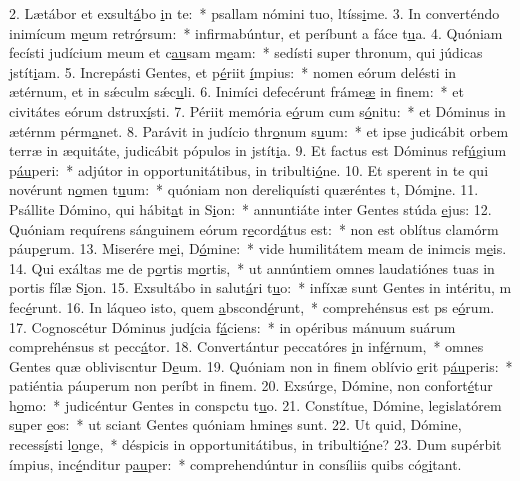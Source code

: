 2. Lætábor et exsult\uline{á}bo \uline{i}n te:~* psallam nómini tuo, ltíss\uline{i}me.
3. In converténdo inimícum m\uline{e}um retr\uline{ó}rsum:~* infirmabúntur, et períbunt a fáce t\uline{u}a.
4. Quóniam fecísti judícium meum et c\uline{au}sam m\uline{e}am:~* sedísti super thronum, qui júdicas jstít\uline{i}am.
5. Increpásti Gentes, et p\uline{é}riit \uline{í}mpius:~* nomen eórum delésti in ætérnum, et in sǽculm sǽc\uline{u}li.
6. Inimíci defecérunt fráme\uline{æ} in f\uline{i}nem:~* et civitátes eórum dstrux\uline{í}sti.
7. Périit memória e\uline{ó}rum cum s\uline{ó}nitu:~* et Dóminus in ætérnm pérm\uline{a}net.
8. Parávit in judício thr\uline{o}num s\uline{u}um:~* et ipse judicábit orbem terræ in æquitáte, judicábit pópulos in jstít\uline{i}a.
9. Et factus est Dóminus ref\uline{ú}gium p\uline{áu}peri:~* adjútor in opportunitátibus, in tribulti\uline{ó}ne.
10. Et sperent in te qui novérunt n\uline{o}men t\uline{u}um:~* quóniam non dereliquísti quæréntes t, Dóm\uline{i}ne.
11. Psállite Dómino, qui hábit\uline{a}t in S\uline{i}on:~* annuntiáte inter Gentes stúda \uline{e}jus:
12. Quóniam requírens sánguinem eórum r\uline{e}cord\uline{á}tus est:~* non est oblítus clamórm páup\uline{e}rum.
13. Miserére m\uline{e}i, D\uline{ó}mine:~* vide humilitátem meam de inimcis m\uline{e}is.
14. Qui exáltas me de p\uline{o}rtis m\uline{o}rtis,~* ut annúntiem omnes laudatiónes tuas in portis fílæ S\uline{i}on.
15. Exsultábo in salut\uline{á}ri t\uline{u}o:~* infíxæ sunt Gentes in intéritu, m fec\uline{é}runt.
16. In láqueo isto, quem \uline{a}bscond\uline{é}runt,~* comprehénsus est ps e\uline{ó}rum.
17. Cognoscétur Dóminus jud\uline{í}cia f\uline{á}ciens:~* in opéribus mánuum suárum comprehénsus st pecc\uline{á}tor.
18. Convertántur peccatóres \uline{i}n inf\uline{é}rnum,~* omnes Gentes quæ obliviscntur D\uline{e}um.
19. Quóniam non in finem oblívio \uline{e}rit p\uline{áu}peris:~* patiéntia páuperum non períbt in f\uline{i}nem.
20. Exsúrge, Dómine, non confort\uline{é}tur h\uline{o}mo:~* judicéntur Gentes in conspctu t\uline{u}o.
21. Constítue, Dómine, legislatórem s\uline{u}per \uline{e}os:~* ut sciant Gentes quóniam hmin\uline{e}s sunt.
22. Ut quid, Dómine, recess\uline{í}sti l\uline{o}nge,~* déspicis in opportunitátibus, in tribulti\uline{ó}ne?
23. Dum supérbit ímpius, inc\uline{é}nditur p\uline{au}per:~* comprehendúntur in consíliis quibs cóg\uline{i}tant.
